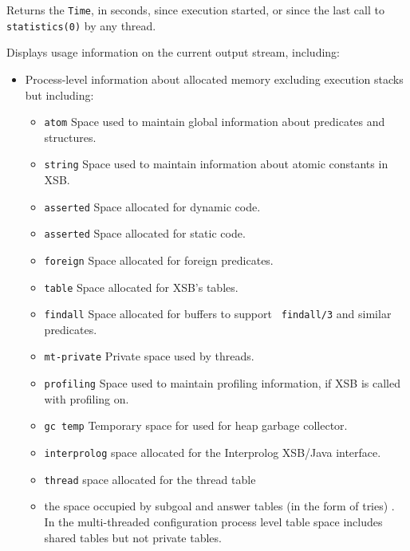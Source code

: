 \begin{description}
%
Returns the \texttt{Time}, in seconds, since execution started, or
since the last call to \texttt{statistics(0)} by any thread.

%
Displays usage information on the current output stream, including: 
\begin{itemize} 
\item Process-level information about allocated memory excluding
  execution stacks but including: 
\begin{itemize}
\item {\tt atom} Space used to maintain global information about
  predicates and structures. 
%
\item {\tt string} Space used to maintain information about atomic
  constants in XSB.
%
\item {\tt asserted} Space allocated for dynamic code.
%
\item {\tt asserted} Space allocated for static code.
%
\item {\tt foreign} Space allocated for foreign predicates.
%
\item {\tt table} Space allocated for XSB's tables.
%
\item {\tt findall} Space allocated for buffers to support {\tt
  findall/3} and similar predicates.
%
\item {\tt mt-private} Private space used by threads.
%
\item {\tt profiling} Space used to maintain profiling information, if
  XSB is called with profiling on.
%
\item {\tt gc temp} Temporary space for used for heap garbage
  collector.
%
\item {\tt interprolog} space allocated for the Interprolog XSB/Java
  interface.
%
\item {\tt thread} space allocated for the thread table
%
\item the space occupied by subgoal and answer tables (in the form of
  tries) \cite{RRSSW98,CuSW99b,TST99}.  In the multi-threaded
  configuration process level table space includes shared tables but
  not private tables.
\end{itemize}


\end{itemize}
\end{description}
